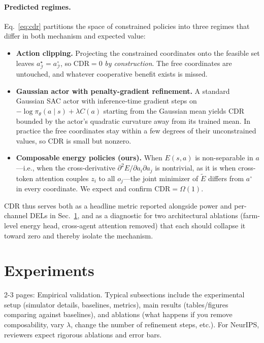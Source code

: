 \documentclass{article}
\begin{document}
\paragraph{Predicted regimes.}
Eq.~\eqref{eq:cdr} partitions the space of constrained policies into three regimes that differ in both mechanism and expected value:
\begin{itemize}
  \item \textbf{Action clipping.} Projecting the constrained coordinates onto the feasible set leaves $a^\star_{\bar{\mathcal{I}}} = a^\circ_{\bar{\mathcal{I}}}$, so $\mathrm{CDR} = 0$ \emph{by construction}. The free coordinates are untouched, and whatever cooperative benefit exists is missed.
  \item \textbf{Gaussian actor with penalty-gradient refinement.} A standard Gaussian SAC actor with inference-time gradient steps on $-\log \pi_\theta(a \mid s) + \lambda C(a)$ starting from the Gaussian mean yields $\mathrm{CDR}$ bounded by the actor's quadratic curvature away from its trained mean. In practice the free coordinates stay within a few degrees of their unconstrained values, so $\mathrm{CDR}$ is small but nonzero.
  \item \textbf{Composable energy policies (ours).} When $E(s, a)$ is non-separable in $a$---i.e., when the cross-derivative $\partial^2 E / \partial a_i \partial a_j$ is nontrivial, as it is when cross-token attention couples $z_i$ to all $o_j$---the joint minimizer of $\widetilde E$ differs from $a^\circ$ in every coordinate. We expect and confirm $\mathrm{CDR} = \Omega(1)$.
\end{itemize}
CDR thus serves both as a headline metric reported alongside power and per-channel DELs in Sec.~\ref{sec:experiments}, and as a diagnostic for two architectural ablations (farm-level energy head, cross-agent attention removed) that each should collapse it toward zero and thereby isolate the mechanism.

\section{Experiments}
\label{sec:experiments}
2-3 pages: Empirical validation. Typical subsections include the experimental setup (simulator details, baselines, metrics), main results (tables/figures comparing against baselines), and ablations (what happens if you remove composability, vary $\lambda$, change the number of refinement steps, etc.). For NeurIPS, reviewers expect rigorous ablations and error bars.
\end{document}
